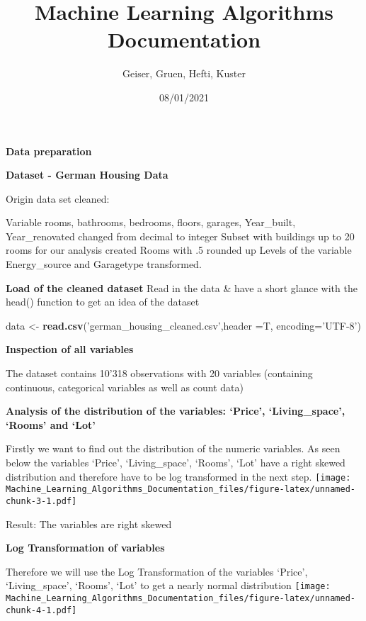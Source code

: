 \documentclass[
]{article}
\title{Machine Learning Algorithms Documentation}
\author{Geiser, Gruen, Hefti, Kuster}
\date{08/01/2021}
\newenvironment{Shaded}{\begin{snugshade}}{\end{snugshade}}
\newcommand{\DataTypeTok}[1]{\textcolor[rgb]{0.13,0.29,0.53}{#1}}
\newcommand{\KeywordTok}[1]{\textcolor[rgb]{0.13,0.29,0.53}{\textbf{#1}}}
\newcommand{\NormalTok}[1]{#1}
\newcommand{\StringTok}[1]{\textcolor[rgb]{0.31,0.60,0.02}{#1}}
\begin{document}
\maketitle

{
\setcounter{tocdepth}{2}
\tableofcontents
}
\textbf{Data preparation}

\textbf{Dataset - German Housing Data}

Origin data set cleaned:

Variable rooms, bathrooms, bedrooms, floors, garages, Year\_built,
Year\_renovated changed from decimal to integer Subset with buildings up
to 20 rooms for our analysis created Rooms with .5 rounded up Levels of
the variable Energy\_source and Garagetype transformed.

\textbf{Load of the cleaned dataset} Read in the data \& have a short
glance with the head() function to get an idea of the dataset

\begin{Shaded}
\begin{Highlighting}[]
\NormalTok{data <-}\StringTok{ }\KeywordTok{read.csv}\NormalTok{(}\StringTok{'german_housing_cleaned.csv'}\NormalTok{,}\DataTypeTok{header =}\NormalTok{T, }\DataTypeTok{encoding=}\StringTok{'UTF-8'}\NormalTok{)}
\end{Highlighting}
\end{Shaded}

\textbf{Inspection of all variables}

The dataset contains 10'318 observations with 20 variables (containing
continuous, categorical variables as well as count data)

\textbf{Analysis of the distribution of the variables: `Price',
`Living\_space', `Rooms' and `Lot'}

Firstly we want to find out the distribution of the numeric variables.
As seen below the variables `Price', `Living\_space', `Rooms', `Lot'
have a right skewed distribution and therefore have to be log
transformed in the next step.
\texttt{[image: Machine\_Learning\_Algorithms\_Documentation\_files/figure-latex/unnamed-chunk-3-1.pdf]}

Result: The variables are right skewed

\textbf{Log Transformation of variables}

Therefore we will use the Log Transformation of the variables `Price',
`Living\_space', `Rooms', `Lot' to get a nearly normal distribution
\texttt{[image: Machine\_Learning\_Algorithms\_Documentation\_files/figure-latex/unnamed-chunk-4-1.pdf]}
\end{document}
